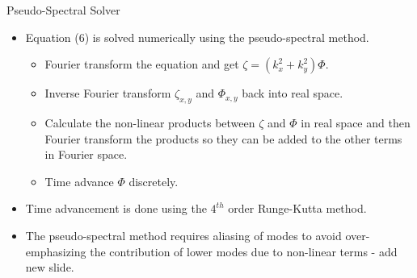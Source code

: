 \documentclass[aspectratio=43]{beamer}
\begin{document}
   \begin{frame}{Pseudo-Spectral Solver}
      \begin{itemize}
         \item Equation (6) is solved numerically using the pseudo-spectral method.
            \begin{itemize}
               \item Fourier transform the equation and get $\zeta=(k_x^2 + k_y^2)\Phi$.
               \item Inverse Fourier transform $\zeta_{x,y}$ and $\Phi_{x,y}$ back into real space.
               \item Calculate the non-linear products between $\zeta$ and $\Phi$ in real space and then Fourier transform the
               products so they can be added to the other terms in Fourier space.
               \item Time advance $\Phi$ discretely.
            \end{itemize}
         \vspace{5mm}
         \item Time advancement is done using the $4^{th}$ order Runge-Kutta method.
         \vspace{5mm}
         \item The pseudo-spectral method requires aliasing of modes to avoid over-emphasizing the contribution of lower modes due to
         non-linear terms - add new slide.
      \end{itemize}
   \end{frame}
\end{document}
